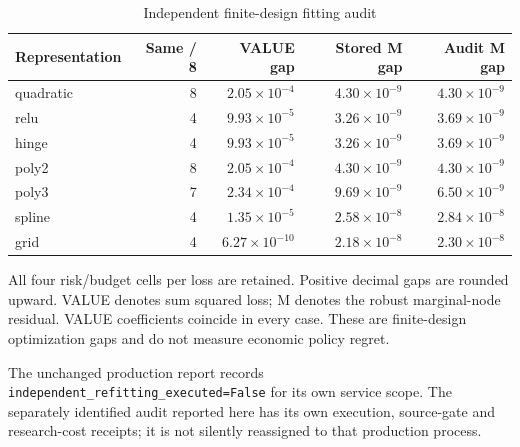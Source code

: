 \begin{table}[t]
\centering\small
\caption{Independent finite-design fitting audit}
\label{tab:fitreproduction126}
\begin{tabular}{lrrrr}
\hline
Representation & Same / 8 & VALUE gap & Stored M gap & Audit M gap \\
\hline
quadratic & 8 & $2.05\times10^{-4}$ & $4.30\times10^{-9}$ & $4.30\times10^{-9}$ \\
relu & 4 & $9.93\times10^{-5}$ & $3.26\times10^{-9}$ & $3.69\times10^{-9}$ \\
hinge & 4 & $9.93\times10^{-5}$ & $3.26\times10^{-9}$ & $3.69\times10^{-9}$ \\
poly2 & 8 & $2.05\times10^{-4}$ & $4.30\times10^{-9}$ & $4.30\times10^{-9}$ \\
poly3 & 7 & $2.34\times10^{-4}$ & $9.69\times10^{-9}$ & $6.50\times10^{-9}$ \\
spline & 4 & $1.35\times10^{-5}$ & $2.58\times10^{-8}$ & $2.84\times10^{-8}$ \\
grid & 4 & $6.27\times10^{-10}$ & $2.18\times10^{-8}$ & $2.30\times10^{-8}$ \\
\hline
\end{tabular}
\par\smallskip\parbox{0.96\linewidth}{\footnotesize All four risk/budget cells per loss are retained. Positive decimal gaps are rounded upward. VALUE denotes sum squared loss; M denotes the robust marginal-node residual. VALUE coefficients coincide in every case. These are finite-design optimization gaps and do not measure economic policy regret.}
\end{table}
The unchanged production report records \nolinkurl{independent_refitting_executed=False} for its own service scope. The separately identified audit reported here has its own execution, source-gate and research-cost receipts; it is not silently reassigned to that production process.
